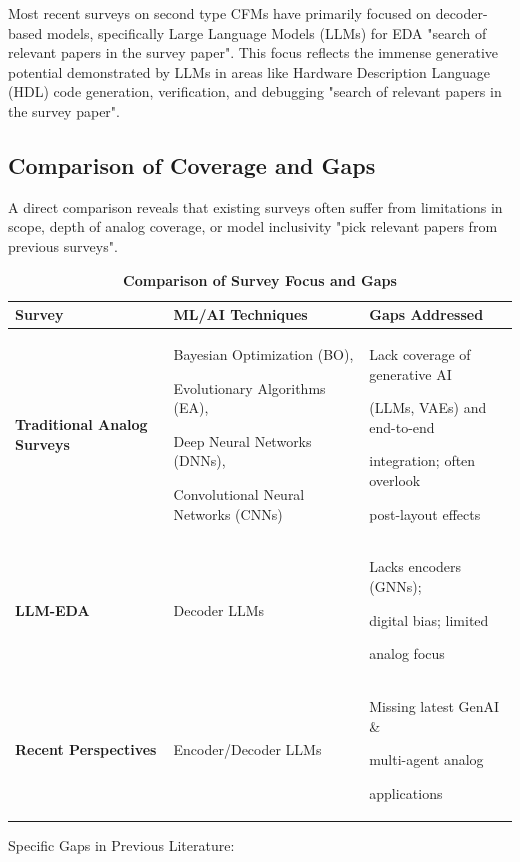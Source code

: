 \documentclass{ieeeaccess}
\begin{document}
Most recent surveys on second type CFMs have primarily focused on decoder-based models, specifically Large Language Models (LLMs) for EDA "search of relevant papers in the survey paper". 
This focus reflects the immense generative potential demonstrated by LLMs in areas like Hardware Description Language (HDL) code generation, verification, and debugging "search of relevant papers in the survey paper".

\subsection{Comparison of Coverage and Gaps}

A direct comparison reveals that existing surveys often suffer from limitations in scope, depth of analog coverage, or model inclusivity "pick relevant papers from previous surveys".

\begin{table}[h!]
\caption{\textbf{Comparison of Survey Focus and Gaps}}
\label{tab:survey_comparison}
\setlength{\tabcolsep}{3pt}
\begin{tabular}{|p{35pt}|p{75pt}|p{105pt}|}
\hline
\textbf{Survey} & \textbf{ML/AI Techniques} & \textbf{Gaps Addressed} \\
\hline
\textbf{Traditional Analog Surveys} & 
Bayesian Optimization (BO), \par Evolutionary Algorithms (EA), \par Deep Neural Networks (DNNs), \par Convolutional Neural Networks (CNNs) & 
Lack coverage of generative AI \par (LLMs, VAEs) and end-to-end \par integration; often overlook \par post-layout effects \\
\hline
\textbf{LLM-EDA} & 
Decoder LLMs & 
Lacks encoders (GNNs); \par digital bias; limited \par analog focus \\
\hline
\textbf{Recent Perspectives} & 
Encoder/Decoder LLMs & 
Missing latest GenAI \& \par multi-agent analog \par applications \\
\hline
\end{tabular}
\end{table}

Specific Gaps in Previous Literature:
\end{document}
